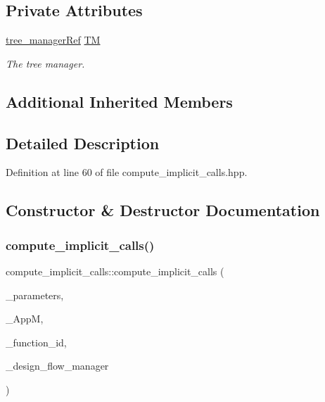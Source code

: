 \subsection*{Private Attributes}
\begin{DoxyCompactItemize}
\item 
\hyperlink{tree__manager_8hpp_a96ff150c071ce11a9a7a1e40590f205e}{tree\+\_\+manager\+Ref} \hyperlink{classcompute__implicit__calls_ae86cc81a2dacd41fbad0f725dbe1e5f2}{TM}
\begin{DoxyCompactList}\small\item\em The tree manager. \end{DoxyCompactList}\end{DoxyCompactItemize}
\subsection*{Additional Inherited Members}


\subsection{Detailed Description}


Definition at line 60 of file compute\+\_\+implicit\+\_\+calls.\+hpp.



\subsection{Constructor \& Destructor Documentation}
\mbox{\label{classcompute__implicit__calls_a6e0a8827ed0c43ffae6b916deb1a57be}} 
\subsubsection{\texorpdfstring{compute\+\_\+implicit\+\_\+calls()}{compute\_implicit\_calls()}}
{\footnotesize\ttfamily compute\+\_\+implicit\+\_\+calls\+::compute\+\_\+implicit\+\_\+calls (\begin{DoxyParamCaption}\item[{const \hyperlink{Parameter_8hpp_a37841774a6fcb479b597fdf8955eb4ea}{Parameter\+Const\+Ref}}]{\+\_\+parameters,  }\item[{const \hyperlink{application__manager_8hpp_a04ccad4e5ee401e8934306672082c180}{application\+\_\+manager\+Ref}}]{\+\_\+\+AppM,  }\item[{unsigned int}]{\+\_\+function\+\_\+id,  }\item[{const Design\+Flow\+Manager\+Const\+Ref}]{\+\_\+design\+\_\+flow\+\_\+manager }\end{DoxyParamCaption})}



